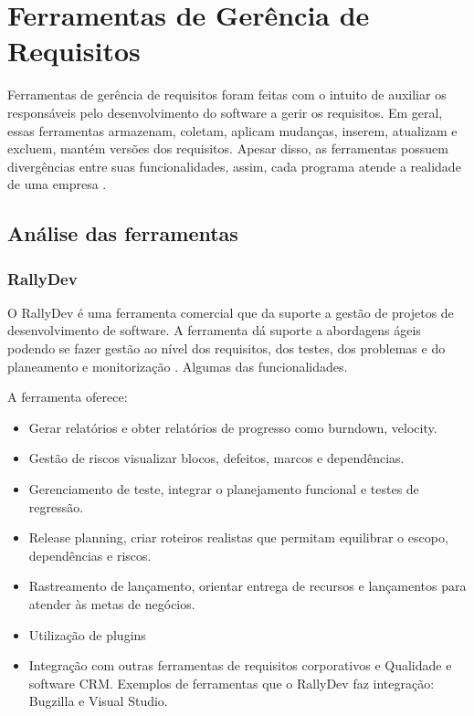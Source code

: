 \chapter[Ferramentas de Gerência de Requisitos]{Ferramentas de Gerência de Requisitos}

Ferramentas de gerência de requisitos foram feitas com o intuito de auxiliar os responsáveis pelo desenvolvimento do software a gerir os requisitos. Em geral, essas ferramentas armazenam, coletam, aplicam mudanças, inserem, atualizam e excluem, mantém versões dos requisitos. Apesar disso, as ferramentas possuem divergências entre suas funcionalidades, assim, cada programa atende a realidade de uma empresa \cite{ananias2009}.

\section{Análise das ferramentas}

\subsection{RallyDev}
O RallyDev é uma ferramenta comercial que da suporte a gestão de projetos de desenvolvimento de software. A ferramenta dá suporte a abordagens ágeis podendo se fazer gestão ao nível dos requisitos, dos testes, dos problemas e do planeamento e monitorização \cite{rallyDev}. Algumas das funcionalidades.

A ferramenta oferece:
\begin{itemize}
    \item Gerar relatórios e obter relatórios de progresso como burndown, velocity.
    \item Gestão de riscos visualizar blocos, defeitos, marcos e dependências.
    \item Gerenciamento de teste, integrar o planejamento funcional e testes de regressão.
    \item Release planning, criar roteiros realistas que permitam equilibrar o escopo, dependências e riscos.
    \item Rastreamento de lançamento, orientar entrega de recursos e lançamentos para atender às metas de negócios.
    \item Utilização de plugins 
    \item Integração com outras ferramentas de requisitos corporativos e Qualidade e software CRM. \newline Exemplos de ferramentas que o RallyDev faz integração: Bugzilla e Visual Studio.
\end{itemize}
               
